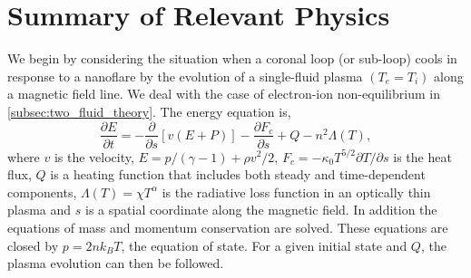 \documentclass[]{aastex}
\begin{document}
	\section{Summary of Relevant Physics}
	\label{sec:phys_sum}
	\par We begin by considering the situation when a coronal loop (or sub-loop) cools in response to a nanoflare by the evolution of a single-fluid plasma $(T_e = T_i)$ along a magnetic field line. We deal with the case of electron-ion non-equilibrium in  \autoref{subsec:two_fluid_theory}. The energy equation is,
	\begin{equation}
		\label{eq:energy_1d}
		\frac{\partial E}{\partial t} = -\frac{\partial}{\partial s}[v(E+P)] - \frac{\partial F_c}{\partial s} + Q - n^2\Lambda(T),
	\end{equation}
where $v$ is the velocity, $E=p/(\gamma -1) + \rho v^2/2$, $F_c=-\kappa_0 T^{5/2}\partial T/\partial s$ is the heat flux, $Q$ is a heating function that includes both steady and time-dependent components, $\Lambda(T)=\chi T^{\alpha}$ is the radiative loss function in an optically thin plasma \citep[e.g.][]{klimchuk_highly_2008} and $s$ is a spatial coordinate along the magnetic field. In addition the equations of mass and momentum conservation are solved. These equations are closed by $p=2nk_BT$, the equation of state. For a given initial state and $Q$, the plasma evolution can then be followed. 
\end{document}
